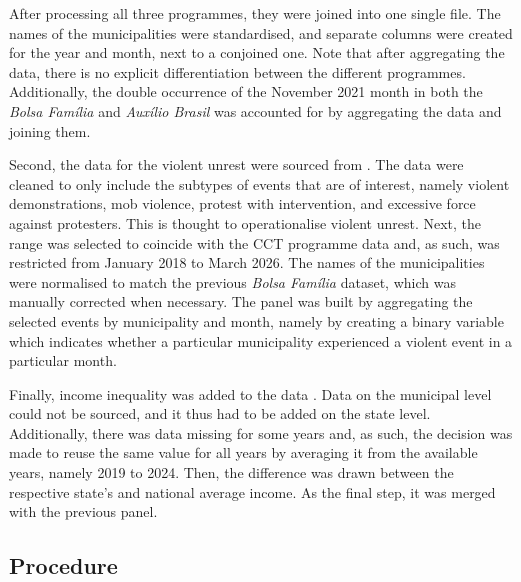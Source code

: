 \documentclass[stu,12pt]{apa7}
\begin{document}
After processing all three programmes, they were joined into one single file. The names of the municipalities were standardised, and separate columns were created for the year and month, next to a conjoined one. Note that after aggregating the data, there is no explicit differentiation between the different programmes. Additionally, the double occurrence of the November 2021 month in both the \textit{Bolsa Família} and \textit{Auxílio Brasil} was accounted for by aggregating the data and joining them.

Second, the data for the violent unrest were sourced from \textcite{ACLED2026}. The data were cleaned to only include the subtypes of events that are of interest, namely violent demonstrations, mob violence, protest with intervention, and excessive force against protesters. This is thought to operationalise violent unrest. Next, the range was selected to coincide with the CCT programme data and, as such, was restricted from January 2018 to March 2026. The names of the municipalities were normalised to match the previous \textit{Bolsa Família} dataset, which was manually corrected when necessary. The panel was built by aggregating the selected events by municipality and month, namely by creating a binary variable which indicates whether a particular municipality experienced a violent event in a particular month.

Finally, income inequality was added to the data \parencite{Tabela7395Rendimento}. Data on the municipal level could not be sourced, and it thus had to be added on the state level. Additionally, there was data missing for some years and, as such, the decision was made to reuse the same value for all years by averaging it from the available years, namely 2019 to 2024. Then, the difference was drawn between the respective state’s and national average income. As the final step, it was merged with the previous panel.

\subsection{Procedure}
\end{document}
